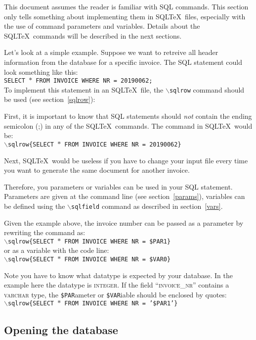 \documentclass{article}
\newcommand{\bs}{\ensuremath{\backslash}}
\newcommand{\vs}{\vspace{3mm}}
\begin{document}
This document assumes the reader is familiar with SQL commands. This section only tells something about
implementing them in SQL\TeX\ files, especially with the use of command parameters and variables.
Details about the SQL\TeX\ commands will be described in the next sections.

\vs

Let's look at a simple example. Suppose we want to retreive all header information from the database
for a specific invoice. The SQL statement could look something like this: \\
\texttt{SELECT $\ast$ FROM INVOICE WHERE NR = 20190062;}\\
To implement this statement in an SQL\TeX\ file, the \texttt{\bs sqlrow} command should be used (see
section~\ref{sqlrow}):

First, it is important to know that SQL statements should \textit{not} contain the ending semicolon (;) in
any of the SQL\TeX\ commands. The command in SQL\TeX\ would be:\\
\texttt{\bs sqlrow\{SELECT $\ast$ FROM INVOICE WHERE NR = 20190062\}}

Next, SQL\TeX\ would be useless if you have to change your input file every time you want to generate
the same document for another invoice.

\vs

Therefore, you parameters or variables can be used in your SQL statement. Parameters are given at the command
line (see section~\ref{params}), variables can be defined using the \texttt{\bs sqlfield} command as
described in section~\ref{vars}.

Given the example above, the invoice number can be passed as a parameter by rewriting the command as: \\
\texttt{\bs sqlrow\{SELECT $\ast$ FROM INVOICE WHERE NR = \$PAR1\}} \\
or as a variable with the code line: \\
\texttt{\bs sqlrow\{SELECT $\ast$ FROM INVOICE WHERE NR = \$VAR0\}}

Note you have to know what datatype is expected by your database. In the example here the datatype is
\textsc{integer}. If the field ``\textsc{invoice\_nr}'' contains a \textsc{varchar} type, the
\texttt{\$PAR}ameter or \texttt{\$VAR}iable should be enclosed by quotes: \\
\texttt{\bs sqlrow\{SELECT $\ast$ FROM INVOICE WHERE NR = '\$PAR1'\}}

\subsection{Opening the database}\label{opendb}
\end{document}
